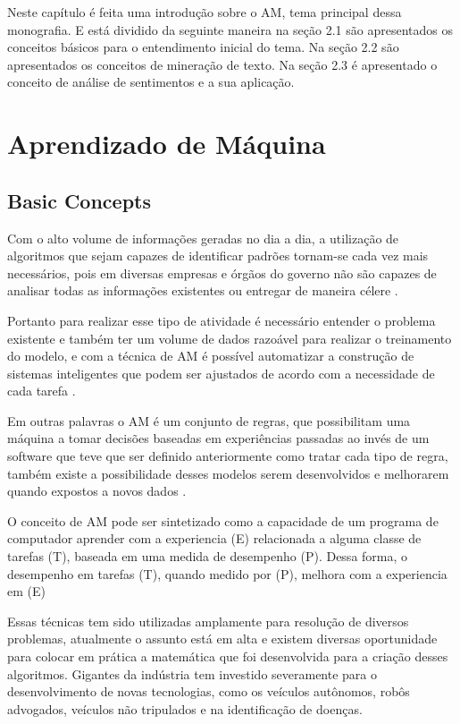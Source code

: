 Neste capítulo é feita uma introdução sobre o \acrshort{AM}, tema principal dessa monografia. E está dividido da seguinte
maneira na seção 2.1 são apresentados os conceitos básicos para o entendimento inicial do tema. Na seção 2.2 são apresentados
os conceitos de mineração de texto. Na seção 2.3 é apresentado o conceito de análise de sentimentos e a sua aplicação.


\section{Aprendizado de Máquina}
  \subsection{Basic Concepts}

    Com o alto volume de informações geradas no dia a dia, a utilização de algoritmos que sejam capazes de identificar padrões tornam-se cada
    vez mais necessários, pois em diversas empresas e órgãos do governo não são capazes de analisar todas as informações existentes ou entregar
    de maneira célere \cite{nasrabadi2007pattern}. 
    
    Portanto para realizar esse tipo de atividade é necessário entender o problema existente e também ter um volume de dados razoável para realizar o treinamento do modelo, e com a técnica de \acrshort{AM} é possível automatizar a construção
    de sistemas inteligentes que podem ser ajustados de acordo com a necessidade de cada tarefa \cite{bonaccorso2017machine}.

    Em outras palavras o \acrshort{AM} é um conjunto de regras, que possibilitam uma máquina a tomar decisões baseadas em experiências passadas ao invés
    de um software que teve que ser definido anteriormente como tratar cada tipo de regra, também existe a possibilidade desses modelos serem desenvolvidos
    e melhorarem quando expostos a novos dados \cite{zurada1995review}.


    O conceito de \acrshort{AM} pode ser sintetizado como a capacidade de um programa de computador aprender com a experiencia (E) relacionada a alguma 
    classe de tarefas (T), baseada em uma medida de desempenho (P). Dessa forma, o desempenho em tarefas (T), quando medido por (P), melhora com a 
    experiencia em (E) \cite{mitchell}

    Essas técnicas tem sido utilizadas amplamente para resolução de diversos problemas, atualmente o assunto está em alta e existem diversas oportunidade
    para colocar em prática a matemática que foi desenvolvida para a criação desses algoritmos. Gigantes da indústria tem investido severamente para
    o desenvolvimento de novas tecnologias, como os veículos autônomos, robôs advogados, veículos não tripulados e na identificação de doenças.


